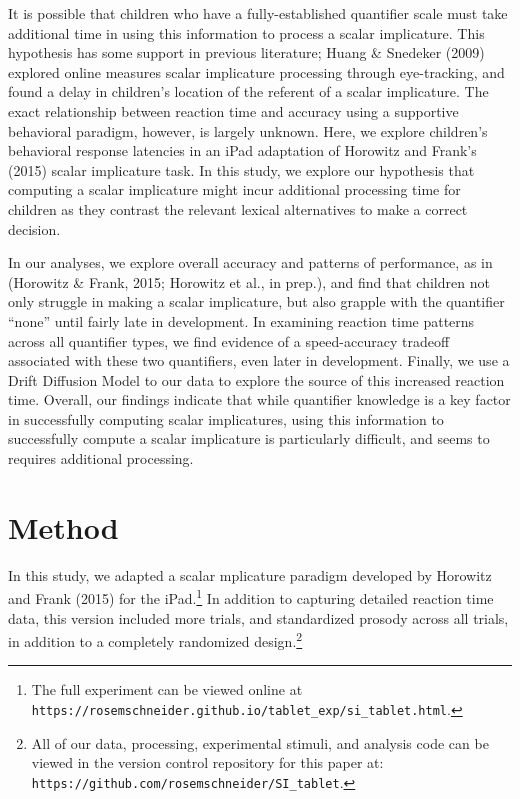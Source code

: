 \documentclass[10pt, letterpaper]{article}
\begin{document}
It is possible that children who have a fully-established quantifier
scale must take additional time in using this information to process a
scalar implicature. This hypothesis has some support in previous
literature; Huang \& Snedeker (2009) explored online measures scalar
implicature processing through eye-tracking, and found a delay in
children's location of the referent of a scalar implicature. The exact
relationship between reaction time and accuracy using a supportive
behavioral paradigm, however, is largely unknown. Here, we explore
children's behavioral response latencies in an iPad adaptation of
Horowitz and Frank's (2015) scalar implicature task. In this study, we
explore our hypothesis that computing a scalar implicature might incur
additional processing time for children as they contrast the relevant
lexical alternatives to make a correct decision.

In our analyses, we explore overall accuracy and patterns of
performance, as in (Horowitz \& Frank, 2015; Horowitz et al., in prep.),
and find that children not only struggle in making a scalar implicature,
but also grapple with the quantifier ``none'' until fairly late in
development. In examining reaction time patterns across all quantifier
types, we find evidence of a speed-accuracy tradeoff associated with
these two quantifiers, even later in development. Finally, we use a
Drift Diffusion Model to our data to explore the source of this
increased reaction time. Overall, our findings indicate that while
quantifier knowledge is a key factor in successfully computing scalar
implicatures, using this information to successfully compute a scalar
implicature is particularly difficult, and seems to requires additional
processing.

\section{Method}\label{method}

In this study, we adapted a scalar mplicature paradigm developed by
Horowitz and Frank (2015) for the
iPad.\footnote{The full experiment can be viewed online at \texttt{https://rosemschneider.github.io/tablet\_exp/si\_tablet.html}.}
In addition to capturing detailed reaction time data, this version
included more trials, and standardized prosody across all trials, in
addition to a completely randomized
design.\footnote{All of our data, processing, experimental stimuli, and analysis code can be viewed in the version control repository for this paper at: \texttt{https://github.com/rosemschneider/SI\_tablet}.}
\end{document}
